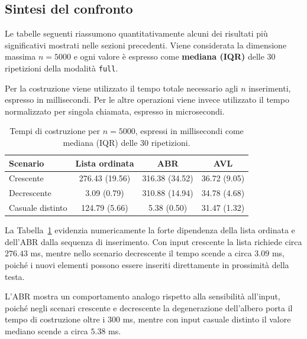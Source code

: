 \documentclass[a4paper,11pt]{article}
\begin{document}
\subsection{Sintesi del confronto}

Le tabelle seguenti riassumono quantitativamente alcuni dei risultati più significativi mostrati nelle sezioni precedenti. Viene considerata la dimensione massima $n=5000$ e ogni valore è espresso come \textbf{mediana (IQR)} delle $30$ ripetizioni della modalità \texttt{full}.

Per la costruzione viene utilizzato il tempo totale necessario agli $n$ inserimenti, espresso in millisecondi. Per le altre operazioni viene invece utilizzato il tempo normalizzato per singola chiamata, espresso in microsecondi.

\begin{table}[H]
    \centering
    \small

    \begin{tabular}{lccc}
        \toprule
        Scenario
        & Lista ordinata
        & ABR
        & AVL \\
        \midrule

        Crescente
        & 276.43 (19.56)
        & 316.38 (34.52)
        & 36.72 (9.05) \\

        Decrescente
        & 3.09 (0.79)
        & 310.88 (14.94)
        & 34.78 (4.68) \\

        Casuale distinto
        & 124.79 (5.66)
        & 5.38 (0.50)
        & 31.47 (1.32) \\

        \bottomrule
    \end{tabular}
    \caption{Tempi di costruzione per $n=5000$, espressi in millisecondi come mediana (IQR) delle 30 ripetizioni.}
     \label{tab:confronto-build-5000}
\end{table}

La Tabella~\ref{tab:confronto-build-5000} evidenzia numericamente la forte dipendenza della lista ordinata e dell'ABR dalla sequenza di inserimento. Con input crescente la lista richiede circa $276.43$ ms, mentre nello scenario decrescente il tempo scende a circa $3.09$ ms, poiché i nuovi elementi possono essere inseriti direttamente in prossimità della testa.

L'ABR mostra un comportamento analogo rispetto alla sensibilità all'input, poiché negli scenari crescente e decrescente la degenerazione dell'albero porta il tempo di costruzione oltre i $300$ ms, mentre con input casuale distinto il valore mediano scende a circa $5.38$ ms.
\end{document}
